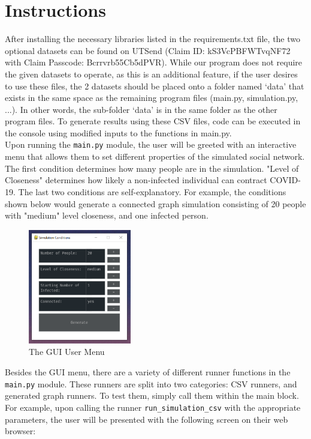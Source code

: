 \documentclass[fontsize=11pt]{article}
\newcommand{\ttt}[1]{\texttt{#1}}
\begin{document}
\section*{Instructions}
After installing the necessary libraries listed in the requirements.txt file, the two optional datasets can be found on UTSend (Claim ID: kS3VcPBFWTvqNF72 with Claim Passcode: Bcrrvrb55Cb5dPVR). While our program does not require the given datasets to operate, as this is an additional feature, if the user desires to use these files, the 2 datasets should be placed onto a folder named ‘data’ that exists in the same space as the remaining program files (main.py, simulation.py, ...). In other words, the sub-folder ‘data’ is in the same folder as the other program files. To generate results using these CSV files, code can be executed in the console using modified inputs to the functions in main.py. \\
\noindent
Upon running the \ttt{main.py} module, the user will be greeted with an interactive menu that allows them to set different properties of the simulated social network. The first condition determines how many people are in the simulation. "Level of Closeness" determines how likely a non-infected individual can contract COVID-19. The last two conditions are self-explanatory. For example, the conditions shown below would generate a connected graph simulation consisting of 20 people with "medium" level closeness, and one infected person.
\begin{figure}[h]
    \centering
    \includegraphics[width=45mm,scale=0.3]{pictures/gui_menu.png}
    \caption{The GUI User Menu}
\end{figure}
\newline
Besides the GUI menu, there are a variety of different runner functions in the \ttt{main.py} module. These runners are split into two categories: CSV runners, and generated graph runners. To test them, simply call them within the main block. For example, upon calling the runner \ttt{run\_simulation\_csv} with the appropriate parameters, the user will be presented with the following screen on their web browser:
\end{document}
